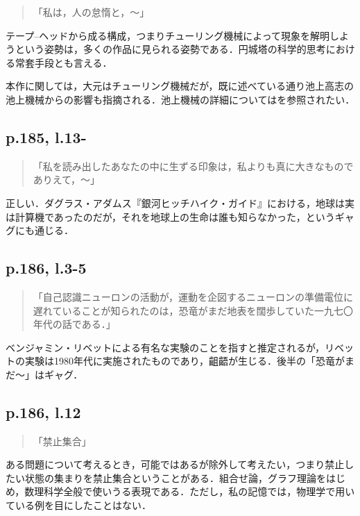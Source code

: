 \documentclass[10pt, a5paper, twoside]{ltjsarticle}
\newcommand{\hyphen}{\insertkanjiskip--\insertkanjiskip}
\begin{document}
            \begin{quote}
                「私は，人の怠惰と，〜」
            \end{quote}

            テープ\hyphen ヘッドから成る構成，つまりチューリング機械によって現象を解明しようという姿勢は，多くの作品に見られる姿勢である．円城塔の科学的思考における常套手段とも言える．

            本作に関しては，大元はチューリング機械だが，既に述べている通り池上高志の池上機械からの影響も指摘される．池上機械の詳細については\cite{tanakah}を参照されたい．

        \subsection{p.185, l.13-}

            \begin{quote}
                「私を読み出したあなたの中に生ずる印象は，私よりも真に大きなものでありえて，〜」
            \end{quote}

            正しい．ダグラス・アダムス『銀河ヒッチハイク・ガイド』における，地球は実は計算機であったのだが，それを地球上の生命は誰も知らなかった，というギャグにも通じる．

        \subsection{p.186, l.3-5}

            \begin{quote}
                「自己認識ニューロンの活動が，運動を企図するニューロンの準備電位に遅れていることが知られたのは，恐竜がまだ地表を闊歩していた一九七〇年代の話である．」
            \end{quote}

            ベンジャミン・リベットによる有名な実験のことを指すと推定されるが，リベットの実験は1980年代に実施されたものであり，齟齬が生じる．後半の「恐竜がまだ〜」はギャグ．

        \subsection{p.186, l.12}

            \begin{quote}
                「禁止集合」
            \end{quote}

            ある問題について考えるとき，可能ではあるが除外して考えたい，つまり禁止したい状態の集まりを禁止集合ということがある．組合せ論，グラフ理論をはじめ，数理科学全般で使いうる表現である．ただし，私の記憶では，物理学で用いている例を目にしたことはない．
\end{document}
